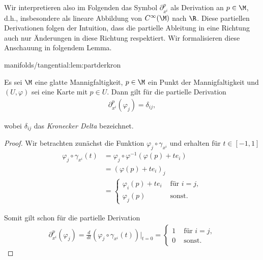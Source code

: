 \documentclass[letterpaper,10pt,german]{jupyterBook}
\begin{document}
\par
Wir interpretieren also im Folgenden das Symbol \(\partial_{x^{i}}^p\) als Derivation an \(p\in\M\), d.h., insbesondere als lineare Abbildung von \(C^\infty(\M)\) nach \(\R\).
Diese partiellen Derivationen folgen der Intuition, dass die partielle Ableitung in eine Richtung auch nur Änderungen in diese Richtung respektiert.
Wir formalisieren diese Anschauung in folgendem Lemma.
\begin{lemma}{}{manifolds/tangential:lem:partderkron}



\par
Es sei \(\M\) eine glatte Mannigfaltigkeit, \(p\in\M\) ein Punkt der Mannigfaltigkeit und \((U,\varphi)\) sei eine Karte mit \(p\in U\).
Dann gilt für die partielle Derivation
\begin{align*}
\partial_{x^i}^p(\varphi_j) = \delta_{ij},
\end{align*}
\par
wobei \(\delta_{ij}\) das \emph{Kronecker Delta} bezeichnet.
\end{lemma}

\begin{proof}
 Wir betrachten zunächst die Funktion \(\varphi_j \circ \gamma_{x^i}\) und erhalten für \(t\in [-1,1]\)
\begin{align*}
\varphi_j \circ \gamma_{x^i}(t)
&= \varphi_j \circ \varphi^{-1}(\varphi(p) + t e_i)\\
&= (\varphi(p) + t e_i)_j\\ 
&=
\begin{cases}
\varphi_i(p) + t e_i &\text{ für } i=j,\\
\varphi_j(p)&\text{ sonst}.
\end{cases}
\end{align*}
\par
Somit gilt schon für die partielle Derivation
\begin{align*}
\partial_{x^i}^p(\varphi_j)=
\frac{d}{dt} (\varphi_j \circ \gamma_{x^i}(t))\big\rvert_{t=0} = 
\begin{cases}
1&\text{ für } i=j,\\
0&\text{ sonst}.
\end{cases}
\end{align*}\end{proof}
\end{document}

